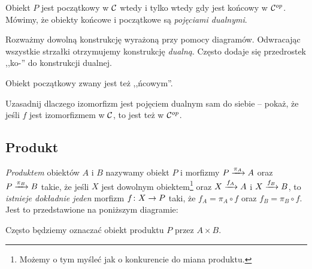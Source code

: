 \begin{exmp}
	Obiekt $P$ jest początkowy w $\C$ wtedy i tylko wtedy gdy jest końcowy w $\op \C$. Mówimy, że obiekty końcowe i początkowe są \emph{pojęciami dualnymi}.
\end{exmp}

\begin{defn}
	Rozważmy dowolną konstrukcję wyrażoną przy pomocy diagramów. Odwracając wszystkie strzałki otrzymujemy konstrukcję \emph{dualną}. Często dodaje się przedrostek ,,ko-'' do konstrukcji dualnej.
\end{defn}

\begin{joke}
	Obiekt początkowy zwany jest też ,,ńcowym''.
\end{joke}

\begin{exc}
	Uzasadnij dlaczego izomorfizm jest pojęciem dualnym sam do siebie -- pokaż, że jeśli $f$ jest izomorfizmem w $\C$, to jest też w $\op \C$.
\end{exc}

\subsection{Produkt}
\begin{defn}
	\emph{Produktem} obiektów $A$ i $B$ nazywamy obiekt $P$ i morfizmy $\morpharr {\pi_A}PA$ oraz $\morpharr {\pi_B}PB$ takie, że jeśli $X$ jest dowolnym obiektem\footnote{Możemy o tym myśleć jak o konkurencie do miana produktu.} oraz $\morpharr {f_A}XA$ i $\morpharr {f_B}XB$, to \emph{istnieje dokładnie jeden} morfizm $\morph fXP$ taki, że $f_A=\pi_A\circ f$ oraz $f_B=\pi_B\circ f$.
  Jest to przedstawione na poniższym diagramie:
  \begin{center}
  \end{center}
  Często będziemy oznaczać obiekt produktu $P$ przez $A\times B$.
\end{defn}

